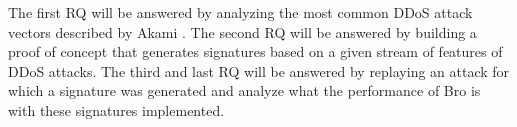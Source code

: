 The first RQ will be answered by analyzing the most common DDoS attack vectors described by Akami \cite{Akamai2017-4}. The second RQ will be answered by building a proof of concept that generates signatures based on a given stream of features of DDoS attacks. The third and last RQ will be answered by replaying an attack for which a signature was generated and analyze what the performance of Bro is with these signatures implemented. 










 
